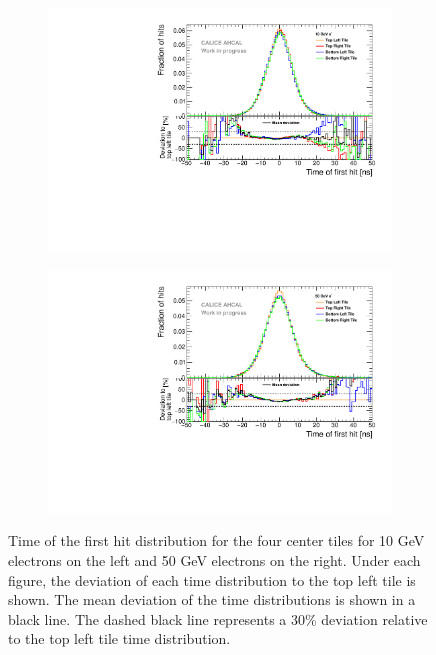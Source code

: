 \begin{figure}[htbp!]
	\begin{subfigure}[t]{0.5\textwidth}
		\centering
		\includegraphics[width=1\textwidth]{../Thesis_Plots/Timing/Electrons/Plots/Systematic_Inhomogeneity_10GeV.pdf}
		\caption{}\label{fig:timing_syst_10GeV}
	\end{subfigure}
	\hfill
	\begin{subfigure}[t]{0.5\textwidth}
		\centering
		\includegraphics[width=1\textwidth]{../Thesis_Plots/Timing/Electrons/Plots/Systematic_Inhomogeneity_50GeV.pdf}
		\caption{}\label{fig:timing_syst_50GeV}
	\end{subfigure}
	\caption{Time of the first hit distribution for the four center tiles for 10 GeV electrons on the left and 50 GeV electrons on the right. Under each figure, the deviation of each time distribution to the top left tile is shown. The mean deviation of the time distributions is shown in a black line. The dashed black line represents a 30\% deviation relative to the top left tile time distribution.} \label{fig:SystTimeElectrons}
\end{figure}

